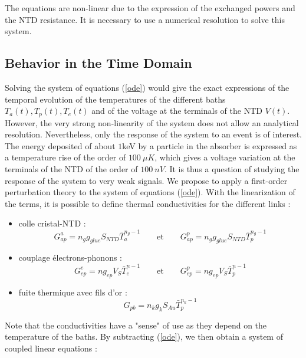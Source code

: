 The equations are non-linear due to the expression of the exchanged powers and the NTD resistance. It is necessary to use a numerical resolution to solve this system. 


\subsection{Behavior in the Time Domain}
\label{temporal}


Solving the system of equations (\ref{ode}) would give the exact expressions of the temporal evolution of the temperatures of the different baths $T_a(t), T_p(t), T_e(t)$ and of the voltage at the terminals of the NTD $V(t)$. However, the very strong non-linearity of the system does not allow an analytical resolution. Nevertheless, only the response of the system to an event is of interest. The energy deposited of about $1$keV by a particle in the absorber is expressed as a temperature rise of the order of $100~\mu K$, which gives a voltage variation at the terminals of the NTD of the order of $100~nV$. It is thus a question of studying the response of the system to very weak signals. We propose to apply a first-order perturbation theory to the system of equations (\ref{ode}). With the linearization of the terms, it is possible to define thermal conductivities for the different links :
\begin{itemize}
\item colle cristal-NTD : \begin{equation}\label{g1} G_{ap}^a  = n_g g_{glue} S_{NTD} \bar{T}_a^{n_g-1} \qquad \textrm{et} \qquad G_{ap}^p  = n_g g_{glue} S_{NTD} \bar{T}_p^{n_g-1}
\end{equation}
\item couplage électrons-phonons : \begin{equation}\label{g2} G_{ep}^e  = n g_{ep} V_S \bar{T}_e^{n-1} \qquad \textrm{et} \qquad G_{ep}^p  = n g_{ep} V_S \bar{T}_p^{n-1}
\end{equation}
\item fuite thermique avec fils d'or : \begin{equation}\label{g3} G_{pb} = n_k g_{k} S_{Au} \bar{T}_p^{n_k-1}
\end{equation}
\end{itemize}
Note that the conductivities have a "sense" of use as they depend on the temperature of the baths. By subtracting (\ref{ode}), we then obtain a system of coupled linear equations :
